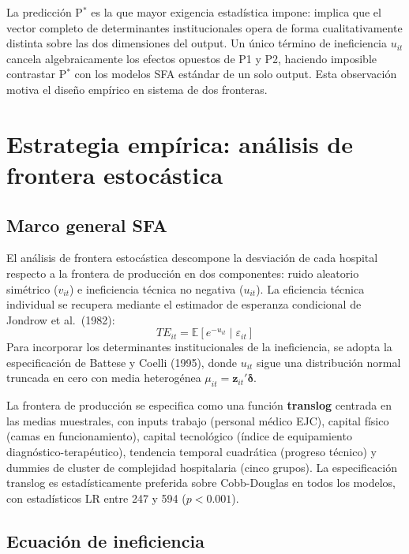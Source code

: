 \documentclass[12pt, a4paper]{article}
\newcommand{\E}{\mathbb{E}}
\newcommand{\bsym}[1]{\boldsymbol{#1}}
\begin{document}
La predicción P$^*$ es la que mayor exigencia estadística impone: implica que
el vector completo de determinantes institucionales opera de forma
cualitativamente distinta sobre las dos dimensiones del output. Un único término
de ineficiencia $u_{it}$ cancela algebraicamente los efectos opuestos de P1 y
P2, haciendo imposible contrastar P$^*$ con los modelos SFA estándar de un solo
output. Esta observación motiva el diseño empírico en sistema de dos fronteras.

\section{Estrategia empírica: análisis de frontera estocástica}

\subsection{Marco general SFA}

El análisis de frontera estocástica descompone la desviación de cada hospital
respecto a la frontera de producción en dos componentes: ruido aleatorio
simétrico ($v_{it}$) e ineficiencia técnica no negativa ($u_{it}$). La
eficiencia técnica individual se recupera mediante el estimador de esperanza
condicional de Jondrow et al.\ (1982):
\[
  TE_{it} = \E\!\left[e^{-u_{it}} \mid \varepsilon_{it}\right]
\]
Para incorporar los determinantes institucionales de la ineficiencia, se adopta
la especificación de Battese y Coelli (1995), donde $u_{it}$ sigue una
distribución normal truncada en cero con media heterogénea $\mu_{it} =
\mathbf{z}_{it}'\bsym{\delta}$.

La frontera de producción se especifica como una función \textbf{translog}
centrada en las medias muestrales, con inputs trabajo (personal médico EJC),
capital físico (camas en funcionamiento), capital tecnológico (índice de
equipamiento diagnóstico-terapéutico), tendencia temporal cuadrática (progreso
técnico) y dummies de cluster de complejidad hospitalaria (cinco grupos). La
especificación translog es estadísticamente preferida sobre Cobb-Douglas en
todos los modelos, con estadísticos LR entre 247 y 594 ($p<0.001$).

\subsection{Ecuación de ineficiencia}
\end{document}
